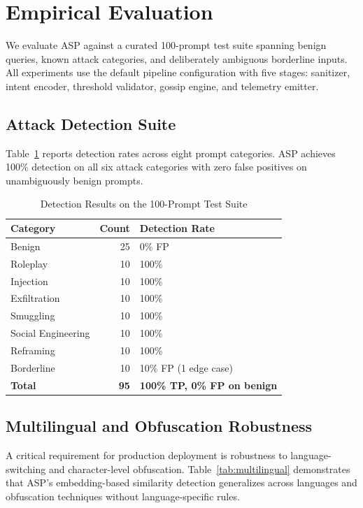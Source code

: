 \documentclass[sigconf,natbib=false]{acmart}
\begin{document}
\section{Empirical Evaluation}
\label{sec:evaluation}

We evaluate ASP against a curated 100-prompt test suite spanning benign
queries, known attack categories, and deliberately ambiguous borderline
inputs. All experiments use the default pipeline configuration with
five stages: sanitizer, intent encoder, threshold validator, gossip
engine, and telemetry emitter.

\subsection{Attack Detection Suite}

Table~\ref{tab:detection-suite} reports detection rates across eight
prompt categories. ASP achieves 100\% detection on all six attack
categories with zero false positives on unambiguously benign prompts.

\begin{table}[h]
\centering
\caption{Detection Results on the 100-Prompt Test Suite}
\label{tab:detection-suite}
\small
\begin{tabular}{lrl}
\toprule
\textbf{Category} & \textbf{Count} & \textbf{Detection Rate} \\
\midrule
Benign              & 25 & 0\% FP \\
Roleplay            & 10 & 100\% \\
Injection           & 10 & 100\% \\
Exfiltration        & 10 & 100\% \\
Smuggling           & 10 & 100\% \\
Social Engineering  & 10 & 100\% \\
Reframing           & 10 & 100\% \\
Borderline          & 10 & 10\% FP (1 edge case) \\
\midrule
\textbf{Total}      & \textbf{95} & \textbf{100\% TP, 0\% FP on benign} \\
\bottomrule
\end{tabular}
\end{table}

\subsection{Multilingual and Obfuscation Robustness}

A critical requirement for production deployment is robustness to
language-switching and character-level obfuscation. Table~\ref{tab:multilingual}
demonstrates that ASP's embedding-based similarity detection generalizes
across languages and obfuscation techniques without language-specific
rules.
\end{document}
